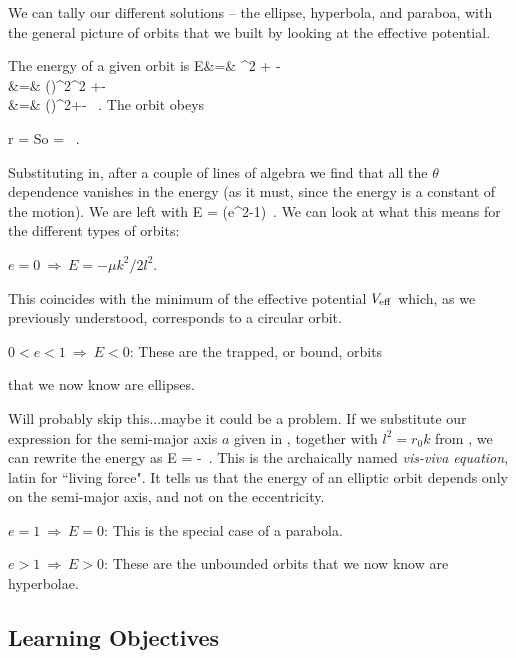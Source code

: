 We can tally our different  solutions  -- the ellipse, hyperbola, and paraboa, with the general picture of orbits that we built by looking at the effective potential. {\co The energy  of a given orbit is
%
\be E&=& \mu{}^2 +  -  \nn\\ &=& \mu \left(\right)^2\dot{\theta}^2 +- \nn\\ &=& \mu\left(\right)^2+-
\ .\ee
%
The orbit obeys
%

\be r = \label{roundandround}\ee
%
So
%
\be{} = \ .\ee
%
}
Substituting in, after a couple of lines of algebra we find that all the $\theta$ dependence vanishes in the energy (as it must, since the energy is a constant of the motion). {\co We are left with
%
\be E = (e^2-1)\ .\label{orbitenergy}\ee
%
We can look at what this means for the different types of orbits:}
%
\begin{itemize}
{\co \item $e=0 \ \Longrightarrow\ E=-\mu k^2/2l^2$. } This coincides with the minimum of the effective potential $V_{\rm eff}$  which, as we previously understood, corresponds to a circular orbit.\vskip 3mm
{\co \item $0<e<1 \ \Longrightarrow\ E<0$: These are the trapped, or bound, orbits} that we now know are ellipses. 

{\cblue Will probably skip this...maybe it could be a problem. If we substitute our expression for the semi-major axis $a$ given in , together with $l^2 = r_0k$ from , we can rewrite the energy as
%
\be E = -\ .\ee
%
This is the archaically named {\it vis-viva equation},  latin for ``living force". It tells us that the energy of an elliptic orbit depends only on the semi-major axis, and not on the eccentricity. } \vskip 3mm
{\co \item $e=1\ \Longrightarrow\ E=0$: This is the special case of a parabola. \vskip 3mm
\item $e>1\ \Longrightarrow \ E>0$: These are the unbounded orbits that we now know are hyperbolae. }
\end{itemize}




\subsection{Learning Objectives}

